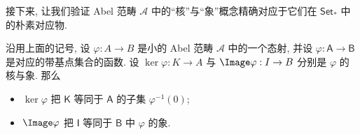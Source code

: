 \indent 接下来, 让我们验证 Abel 范畴 $\mathcal{A}$ 中的``核''与``象''概念精确对应于它们在 $\mathsf{Set}_*$ 中的朴素对应物.

\begin{lemma}\label{lem:kernel-image-elements}
沿用上面的记号, 设 $\varphi:A\to B$ 是小的 Abel 范畴 $\mathcal{A}$ 中的一个态射, 并设 $\varphi:\mathsf{A}\to\mathsf{B}$ 是对应的带基点集合的函数. 设 $\ker\varphi:K\to A$ 与 $\Image\varphi:I\to B$ 分别是 $\varphi$ 的核与象. 那么
\begin{itemize}
\item $\ker\varphi$ 把 $\mathsf{K}$ 等同于 $\mathsf{A}$ 的子集 $\varphi^{-1}(0)$;
\item $\Image\varphi$ 把 $\mathsf{I}$ 等同于 $\mathsf{B}$ 中 $\varphi$ 的象.
\end{itemize}
\end{lemma}

